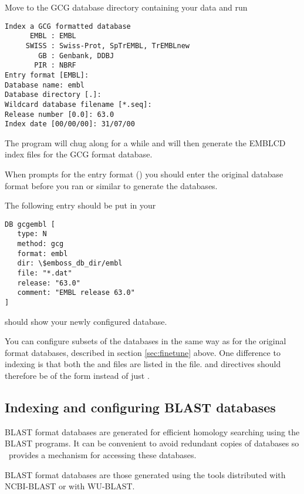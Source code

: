 \documentclass{report}
\begin{document}
Move to the GCG database directory containing your data and run

\begin{verbatim}
Index a GCG formatted database
      EMBL : EMBL
     SWISS : Swiss-Prot, SpTrEMBL, TrEMBLnew
        GB : Genbank, DDBJ
       PIR : NBRF
Entry format [EMBL]: 
Database name: embl
Database directory [.]: 
Wildcard database filename [*.seq]: 
Release number [0.0]: 63.0
Index date [00/00/00]: 31/07/00
\end{verbatim}

The program will chug along for a while and will then generate the
EMBLCD index files for the GCG format database.

When  prompts for the entry format () you should enter the original database format before
you ran  or similar to generate the 
databases.

The following entry should be put in your 

\begin{verbatim}
DB gcgembl [
   type: N
   method: gcg
   format: embl
   dir: \$emboss_db_dir/embl
   file: "*.dat"
   release: "63.0"
   comment: "EMBL release 63.0"
]
\end{verbatim}

 should show your newly configured database.

You can configure subsets of the databases in the same way as for the
original format databases, described in section \ref{sec:finetune}
above. One difference to  indexing is that both the
 and  files are listed in the
 file.  and 
directives should therefore be of the form  instead of just .

\subsection{Indexing and configuring BLAST databases}
BLAST format databases are generated for efficient homology searching
using the BLAST programs. It can be convenient to avoid redundant
copies of databases so \EMBOSS\ provides a mechanism for accessing
these databases.

BLAST format databases are those generated using the tools distributed
with NCBI-BLAST or with WU-BLAST.
\end{document}
